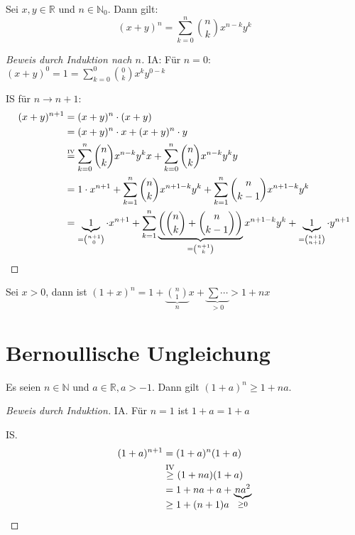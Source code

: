 \begin{theorem}
  Sei $x, y \in \mathbb{R}$ und $n \in \mathbb{N}_0$. Dann gilt: \[ (x+y)^n =  \sum_{k=0}^n \binom{n}{k} x^{n-k} y^k \]
\end{theorem}
\begin{proof}[Beweis durch Induktion nach $n$]
  IA: Für $n = 0$: $(x+y)^0 = 1 = \sum_{k=0}^0 \binom{0}{k} x^k y^{0-k}$

  IS für $n \to n+1$:
  \begin{align*}
    (x+y)^{n+1} &= (x+y)^n \cdot (x+y) \\
    \,&= (x+y)^n \cdot x + (x+y)^n \cdot y \\
    \,&\stackrel{\text{\tiny IV}}{=} \sum_{k=0}^n \binom{n}{k} x^{n-k} y^k x + \sum_{k=0}^n \binom{n}{k} x^{n-k} y^k y \\
    \,&= 1 \cdot x^{n+1} + \sum_{k=1}^n \binom{n}{k} x^{n+1-k}y^k + \sum_{k=1}^n \binom{n}{k-1} x^{n+1-k}y^k \\
    \,&= \underbrace{1}_{= \binom{n+1}{0}} \cdot x^{n+1} + \sum_{k=1}^n \underbrace{\left( \binom{n}{k} + \binom{n}{k-1} \right)}_{= \binom{n+1}{k}} x^{n+1-k} y^k + \underbrace{1}_{= \binom{n+1}{n+1}} \cdot y^{n+1}
  \end{align*}
\end{proof}
\begin{remark}
  Sei $x > 0$, dann ist \( (1+x)^n = 1 + \underbrace{\binom{n}{1}}_n x + \underbrace{\sum \cdots}_{> 0} > 1 +nx \)
\end{remark}

\section{Bernoullische Ungleichung}
\begin{theorem}
  Es seien $n \in \mathbb{N}$ und $a \in \mathbb{R}, a > -1$. Dann gilt $(1+a)^n \ge 1 + na$.
\end{theorem}
\begin{proof}[Beweis durch Induktion]
  IA. Für $n=1$ ist $1 + a = 1 + a$

  IS.
  \begin{align*}
    (1+a)^{n+1} &= (1+a)^n (1+a) \\
                &\stackrel{\text{\scriptsize IV}}{\ge} (1+na) (1+a) \\
    \,&= 1 + na + a + \smash{\underbrace{na^2}_{\ge 0}} \\
    \,&\ge 1 + (n+1)a
  \end{align*}
\end{proof}